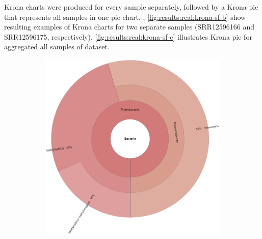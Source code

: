     Krona charts were produced for every sample separately, followed by a Krona pie that represents all samples in one pie chart. , \ref{fig:results:real:krona-sf-b} show resulting examples of Krona charts for two separate samples (SRR12596166 and SRR12596175, respectively), \cref{fig:results:real:krona-sf-c} illustrates Krona pie for aggregated all samples of dataset. 
    
    \begin{figure}[ht!]
        \centering
        \begin{subfigure}[b]{0.3\textwidth}
        \includegraphics[width=1\textwidth]{figures/results/real/krona/krona-sf-sSRR12596166.png}
        \label{fig:results:real:krona-sf-a}
        \end{subfigure}
        \hfill
        \begin{subfigure}[b]{0.3\textwidth}

\end{subfigure}
\end{figure}
